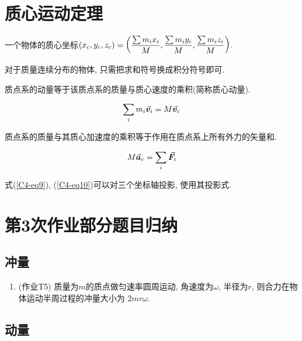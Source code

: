 \section{质心运动定理} \label{4.3}

一个物体的质心坐标$(x_c, y_c, z_c) = \qty(\dfrac{\sum m_i x_i}{M}, \dfrac{\sum m_i y_i}{M}, \dfrac{\sum m_i z_i}{M})$. 

\vskip 0.3cm

对于质量连续分布的物体, 只需把求和符号换成积分符号即可. 

\begin{theorem}[质心运动定理] \label{C4-th3}
	
	质点系的动量等于该质点系的质量与质心速度的乘积(简称质心动量). 
	
	\begin{equation}
		\sum\limits_{i} m_i \va*{v}_i = M \va*{v}_c \label{C4-eq9}
	\end{equation}
	
	质点系的质量与其质心加速度的乘积等于作用在质点系上所有外力的矢量和. 
	
	\begin{equation}
		M \va*{a}_c = \sum\limits_{i} \va*{F}_i \label{C4-eq10}
	\end{equation}
	
\end{theorem}

式(\ref{C4-eq9}), (\ref{C4-eq10})可以对三个坐标轴投影, 使用其投影式. 

\newpage

\section{第3次作业部分题目归纳} \label{4.4}

\subsection{冲量}

\begin{enumerate}
	
	\item (作业T5) 质量为$m$的质点做匀速率圆周运动, 角速度为$\omega$, 半径为$r$, 则合力在物体运动半周过程的冲量大小为 \uline{$2mr\omega$}. 
	
\end{enumerate}

\subsection{动量}

